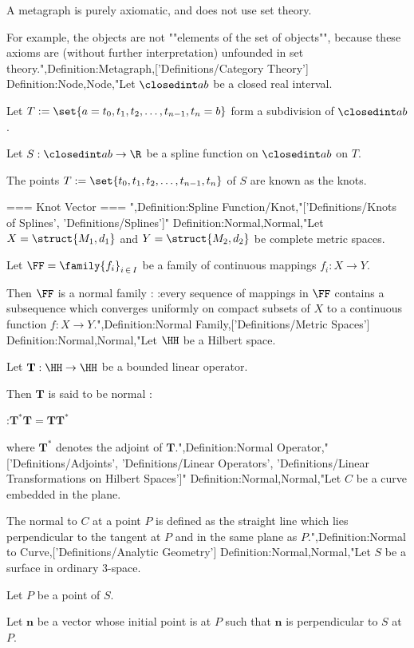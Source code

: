 A metagraph is purely axiomatic, and does not use set theory.

For example, the objects are not ""elements of the set of objects"", because these axioms are (without further interpretation) unfounded in set theory.",Definition:Metagraph,['Definitions/Category Theory']
Definition:Node,Node,"Let $\closedint a b$ be a closed real interval.

Let $T := \set {a = t_0, t_1, t_2, \ldots, t_{n - 1}, t_n = b}$ form a subdivision of $\closedint a b$.

Let $S: \closedint a b \to \R$ be a spline function on $\closedint a b$ on $T$.


The points $T := \set {t_0, t_1, t_2, \ldots, t_{n - 1}, t_n}$ of $S$ are known as the knots.


=== Knot Vector ===
",Definition:Spline Function/Knot,"['Definitions/Knots of Splines', 'Definitions/Splines']"
Definition:Normal,Normal,"Let $X = \struct {M_1, d_1}$ and $Y = \struct {M_2, d_2}$ be complete metric spaces.

Let $\FF = \family {f_i}_{i \mathop \in I}$ be a family of continuous mappings $f_i: X \to Y$.


Then $\FF$ is a normal family :
:every sequence of mappings in $\FF$ contains a subsequence which converges uniformly on compact subsets of $X$ to a continuous function $f: X \to Y$.",Definition:Normal Family,['Definitions/Metric Spaces']
Definition:Normal,Normal,"Let $\HH$ be a Hilbert space.

Let $\mathbf T: \HH \to \HH$ be a bounded linear operator.


Then $\mathbf T$ is said to be normal :

:$\mathbf T^* \mathbf T = \mathbf T \mathbf T^*$

where $\mathbf T^*$ denotes the adjoint of $\mathbf T$.",Definition:Normal Operator,"['Definitions/Adjoints', 'Definitions/Linear Operators', 'Definitions/Linear Transformations on Hilbert Spaces']"
Definition:Normal,Normal,"Let $C$ be a curve embedded in the plane.

The normal to $C$ at a point $P$ is defined as the straight line which lies perpendicular to the tangent at $P$ and in the same plane as $P$.",Definition:Normal to Curve,['Definitions/Analytic Geometry']
Definition:Normal,Normal,"Let $S$ be a surface in ordinary $3$-space.

Let $P$ be a point of $S$.


Let $\mathbf n$ be a vector whose initial point is at $P$ such that $\mathbf n$ is perpendicular to $S$ at $P$.


